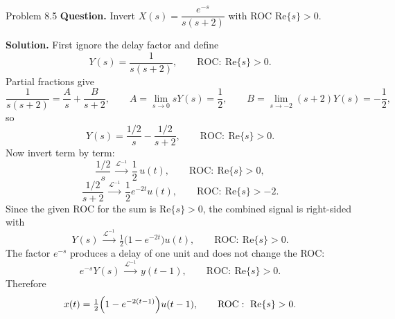 \documentclass[10pt]{article}
\newcommand{\ROC}{\mathrm{ROC}}
\newcommand{\LT}{\mathcal{L}}
\newcommand{\Prompt}[1]{\textbf{Question.} #1}
\newcommand{\SketchLabel}{\tcblower\textbf{Solution.}}
\newcommand{\Linvpair}[2]{#1\,\mathrel{\overset{\LT^{-1}}{\longrightarrow}}\,#2}
\begin{document}
\begin{examplebox}{Problem 8.5}
  \Prompt{Invert \(X(s)=\dfrac{e^{-s}}{s(s+2)}\) with ROC \(\text{Re}\{s\}>0\).}

  \medskip
  \SketchLabel{}
  First ignore the delay factor and define
  \[
    Y(s)=\frac{1}{s(s+2)},
    \qquad
    \ROC:\ \text{Re}\{s\}>0.
  \]
  Partial fractions give
  \[
    \frac{1}{s(s+2)}=\frac{A}{s}+\frac{B}{s+2},
    \qquad
    A=\lim_{s\to0}sY(s)=\frac12,
    \qquad
    B=\lim_{s\to-2}(s+2)Y(s)=-\frac12,
  \]
  so
  \[
    Y(s)=\frac{1/2}{s}-\frac{1/2}{s+2},
    \qquad
    \ROC:\ \text{Re}\{s\}>0.
  \]
  Now invert term by term:
  \[
    \Linvpair{\frac{1/2}{s}}{\frac12\,u(t)},
    \qquad
    \ROC:\ \text{Re}\{s\}>0,
  \]
  \[
    \Linvpair{\frac{1/2}{s+2}}{\frac12 e^{-2t}u(t)},
    \qquad
    \ROC:\ \text{Re}\{s\}>-2.
  \]
  Since the given ROC for the sum is \(\text{Re}\{s\}>0\), the combined signal is right-sided with
  \[
    \Linvpair{Y(s)}{\tfrac12\bigl(1-e^{-2t}\bigr)u(t)},
    \qquad
    \ROC:\ \text{Re}\{s\}>0.
  \]
  The factor \(e^{-s}\) produces a delay of one unit and does not change the ROC:
  \[
    \Linvpair{e^{-s}Y(s)}{y(t-1)},
    \qquad
    \ROC:\ \text{Re}\{s\}>0.
  \]
  Therefore
  \[
    x(t)=\tfrac12\Bigl(1-e^{-2(t-1)}\Bigr)u(t-1),
    \qquad
    \ROC:\ \text{Re}\{s\}>0.
  \]


\end{examplebox}
\end{document}
